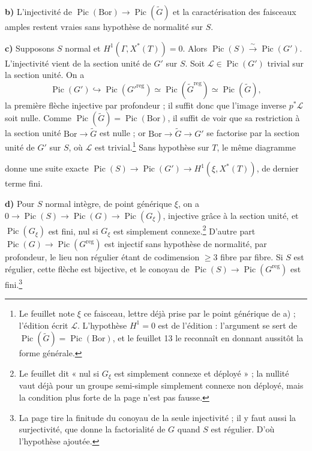 \documentclass[11pt,a4paper]{article}
\begin{document}
\textbf{b)} L'injectivité de
$\operatorname{Pic}(\mathrm{Bor})\to\operatorname{Pic}(\widetilde{G})$ et la
caractérisation des faisceaux amples restent vraies sans hypothèse de
normalité sur $S$.

\textbf{c)} Supposons $S$ normal et $H^{1}(\Gamma,X^{*}(T))=0$. Alors
$\operatorname{Pic}(S)\xrightarrow{\sim}\operatorname{Pic}(G')$.
L'injectivité vient de la section unité de $G'$ sur $S$. Soit
$\mathcal{L}\in\operatorname{Pic}(G')$ trivial sur la section unité. On a
\[
  \operatorname{Pic}(G')\hookrightarrow\operatorname{Pic}(G'^{\mathrm{reg}})
  \simeq\operatorname{Pic}(\widetilde{G}^{\mathrm{reg}})
  \simeq\operatorname{Pic}(\widetilde{G}),
\]
la première flèche injective par profondeur ; il suffit donc que l'image
inverse $p^{*}\mathcal{L}$ soit nulle. Comme
$\operatorname{Pic}(\widetilde{G})=\operatorname{Pic}(\mathrm{Bor})$, il suffit
de voir que sa restriction à la section unité $\mathrm{Bor}\to\widetilde{G}$
est nulle ; or $\mathrm{Bor}\to\widetilde{G}\to G'$ se factorise par la
section unité de $G'$ sur $S$, où $\mathcal{L}$ est trivial.\footnote{Le
feuillet note $\xi$ ce faisceau, lettre déjà prise par le point générique de
a) ; l'édition écrit $\mathcal{L}$. L'hypothèse $H^{1}=0$ est de l'édition :
l'argument se sert de
$\operatorname{Pic}(\widetilde{G})=\operatorname{Pic}(\mathrm{Bor})$, et le
feuillet 13 le reconnaît en donnant aussitôt la forme générale.} Sans
hypothèse sur $T$, le même diagramme


donne une suite exacte $\operatorname{Pic}(S)\to\operatorname{Pic}(G')\to
H^{1}(\xi,X^{*}(T))$, de dernier terme fini.

\textbf{d)} Pour $S$ normal intègre, de point générique $\xi$, on a
$0\to\operatorname{Pic}(S)\to\operatorname{Pic}(G)\to
\operatorname{Pic}(G_{\xi})$, injective grâce à la section unité, et
$\operatorname{Pic}(G_{\xi})$ est fini, nul si $G_{\xi}$ est simplement
connexe.\footnote{Le feuillet dit « nul si $G_{\xi}$ est simplement connexe et
déployé » ; la nullité vaut déjà pour un groupe semi-simple simplement connexe
non déployé, mais la condition plus forte de la page n'est pas fausse.}
D'autre part
$\operatorname{Pic}(G)\to\operatorname{Pic}(G^{\mathrm{reg}})$ est injectif
sans hypothèse de normalité, par profondeur, le lieu non régulier étant de
codimension $\geqslant 3$ fibre par fibre. Si $S$ est régulier, cette flèche
est bijective, et le conoyau de
$\operatorname{Pic}(S)\to\operatorname{Pic}(G^{\mathrm{reg}})$ est
fini.\footnote{La page tire la finitude du conoyau de la seule injectivité ;
il y faut aussi la surjectivité, que donne la factorialité de $G$ quand $S$ est
régulier. D'où l'hypothèse ajoutée.}
\end{document}
